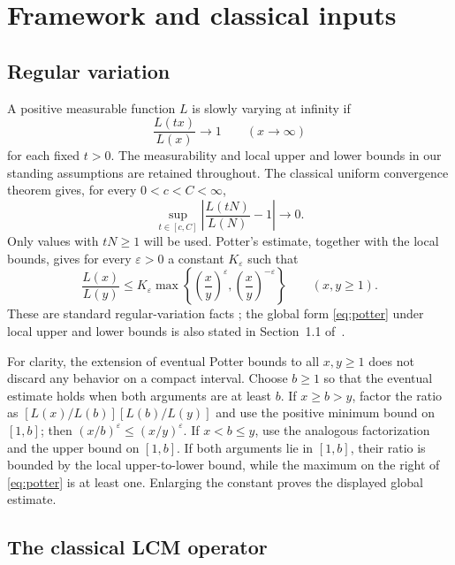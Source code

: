 \section{Framework and classical inputs}
\label{sec:framework}

\subsection{Regular variation}

A positive measurable function $L$ is slowly varying at infinity if
\begin{equation}
 \frac{L(tx)}{L(x)}\longrightarrow1\qquad(x\to\infty)
 \label{eq:slow}
\end{equation}
for each fixed $t>0$. The measurability and local upper and lower bounds
in our standing assumptions are retained throughout. The classical
uniform convergence theorem gives, for every $0<c<C<\infty$,
\begin{equation}
 \sup_{t\in[c,C]}
 \left|\frac{L(tN)}{L(N)}-1\right|\longrightarrow0.
 \label{eq:uct}
\end{equation}
Only values with $tN\ge1$ will be used. Potter's estimate, together
with the local bounds, gives for every $\varepsilon>0$ a constant
$K_\varepsilon$ such that
\begin{equation}
 \frac{L(x)}{L(y)}\le K_\varepsilon
 \max\left\{\left(\frac{x}{y}\right)^\varepsilon,
             \left(\frac{x}{y}\right)^{-\varepsilon}\right\}
 \qquad(x,y\ge1).
 \label{eq:potter}
\end{equation}
These are standard regular-variation facts
\cite{BinghamGoldieTeugels1987}; the global form
\eqref{eq:potter} under local upper and lower bounds is also stated in
Section~1.1 of~\cite{Hilberdink2017}.

For clarity, the extension of eventual Potter bounds to all $x,y\ge1$
does not discard any behavior on a compact interval. Choose $b\ge1$
so that the eventual estimate holds when both arguments are at least
$b$. If $x\ge b>y$, factor the ratio as
$[L(x)/L(b)][L(b)/L(y)]$ and use the positive minimum bound on
$[1,b]$; then $(x/b)^\varepsilon\le(x/y)^\varepsilon$.
If $x<b\le y$, use the analogous factorization and the upper bound on
$[1,b]$. If both arguments lie in $[1,b]$, their ratio is bounded by
the local upper-to-lower bound, while the maximum on the right of
\eqref{eq:potter} is at least one. Enlarging the constant proves the
displayed global estimate.

\subsection{The classical LCM operator}

